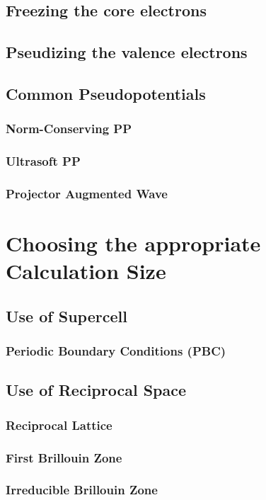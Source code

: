     \subsection{Freezing the core electrons}
    \subsection{Pseudizing the valence electrons}
    \subsection{Common Pseudopotentials}
        \subsubsection{Norm-Conserving PP}
        \subsubsection{Ultrasoft PP}
        \subsubsection{Projector Augmented Wave}
\section{Choosing the appropriate Calculation Size}
    \subsection{Use of Supercell}
        \subsubsection{Periodic Boundary Conditions (PBC)}
    \subsection{Use of Reciprocal Space}
        \subsubsection{Reciprocal Lattice}
        \subsubsection{First Brillouin Zone}
        \subsubsection{Irreducible Brillouin Zone}
